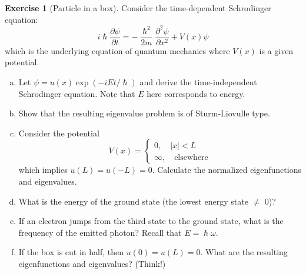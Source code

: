 \documentclass[12pt]{article}
\newcommand{\abs}[1]{ \left| #1 \right| }
\theoremstyle{definition}
\newtheorem{exer}{Exercise}
\theoremstyle{remark}
\begin{document}
\begin{exer}[Particle in a box]

    Consider the time-dependent Schrodinger equation:
    \begin{equation*}
        i \hslash \frac{\partial \psi}{\partial t} = - \frac{\hslash^{2}}{2m} \frac{\partial^{2} \psi}{\partial x^{2}} + V(x) \psi
    \end{equation*}
    which is the underlying equation of quantum mechanics where $V(x)$ is a given potential.

    \begin{enumerate}[(a)]
        \item Let $\psi = u(x) \exp(-iEt / \hslash)$ and derive the time-independent Schrodinger equation. Note that $E$ here corresponds to energy. 
        \item Show that the resulting eigenvalue problem is of Sturm-Liovulle type.
        \item Consider the potential
            \begin{equation*}
                V(x) = 
                \begin{cases}
                    0,\quad \abs{x} < L\\
                    \infty, \quad\text{elsewhere}
                \end{cases}
            \end{equation*}
            which implies $u(L) = u(-L) = 0$. Calculate the normalized eigenfunctions and eigenvalues.
        \item What is the energy of the ground state (the lowest energy state  $\neq $ 0)?
        \item If an electron jumps from the third state to the ground state, what is the frequency of the emitted photon? Recall that $E = \hslash \omega$.
        \item If the box is cut in half, then $u(0) = u(L) = 0$. What are the resulting eigenfunctions and eigenvalues? (Think!)
    \end{enumerate}
\end{exer}
\end{document}
